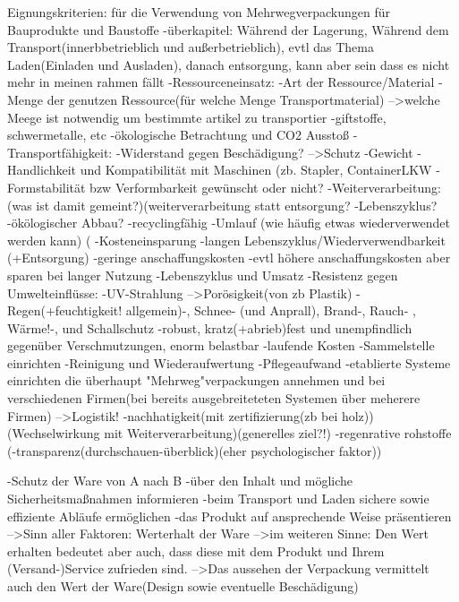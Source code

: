     Eignungskriterien: für die Verwendung von Mehrwegverpackungen für Bauprodukte und Baustoffe
            -überkapitel: Während der Lagerung, Während dem Transport(innerbbetrieblich und außerbetrieblich), evtl das Thema Laden(Einladen und Ausladen), danach entsorgung, kann aber sein dass es nicht mehr in meinen rahmen fällt
        -Ressourceneinsatz: 
                -Art der Ressource/Material
                -Menge der genutzen Ressource(für welche Menge Transportmaterial)
                        -->welche Meege ist notwendig um bestimmte artikel zu transportier
                -giftstoffe, schwermetalle, etc
                -ökologische Betrachtung und CO2 Ausstoß
        -Transportfähigkeit:
                -Widerstand gegen Beschädigung? -->Schutz
                -Gewicht
                -Handlichkeit und Kompatibilität mit Maschinen (zb. Stapler, ContainerLKW
                -Formstabilität bzw Verformbarkeit gewünscht oder nicht?
        -Weiterverarbeitung:(was ist damit gemeint?)(weiterverarbeitung statt entsorgung?
                -Lebenszyklus?
                -ökölogischer Abbau?
                -recyclingfähig
                -Umlauf (wie häufig etwas wiederverwendet werden kann)
                (%
        -Kosteneinsparung
                -langen Lebenszyklus/Wiederverwendbarkeit (+Entsorgung)
                -geringe anschaffungskosten
                -evtl höhere anschaffungskosten aber sparen bei langer Nutzung
        -Lebenszyklus und Umsatz
        -Resistenz gegen Umwelteinflüsse:
            -UV-Strahlung -->Porösigkeit(von zb Plastik)
            -Regen(+feuchtigkeit! allgemein)-, Schnee- (und Anprall), Brand-, Rauch- , Wärme!-, und Schallschutz
            -robust, kratz(+abrieb)fest und unempfindlich gegenüber Verschmutzungen, enorm belastbar
        -laufende Kosten
            -Sammelstelle einrichten
            -Reinigung und Wiederaufwertung
            -Pflegeaufwand
            -etablierte Systeme einrichten die überhaupt "Mehrweg"verpackungen annehmen und bei verschiedenen Firmen(bei bereits ausgebreiteteten Systemen über meherere Firmen) -->Logistik!
        -nachhatigkeit(mit zertifizierung(zb bei holz))(Wechselwirkung mit Weiterverarbeitung)(generelles ziel?!)
            -regenrative rohstoffe
        (-transparenz(durchschauen-überblick)(eher psychologischer faktor))
        
    -Schutz der Ware von A nach B
    -über den Inhalt und mögliche Sicherheitsmaßnahmen informieren
    -beim Transport und Laden sichere sowie effiziente Abläufe ermöglichen
    -das Produkt auf ansprechende Weise präsentieren
    -->Sinn aller Faktoren: Werterhalt der Ware
            -->im weiteren Sinne: Den Wert erhalten bedeutet aber auch, dass diese mit dem Produkt und Ihrem (Versand-)Service zufrieden sind.
            -->Das aussehen der Verpackung vermittelt auch den Wert der Ware(Design sowie eventuelle Beschädigung)
    
